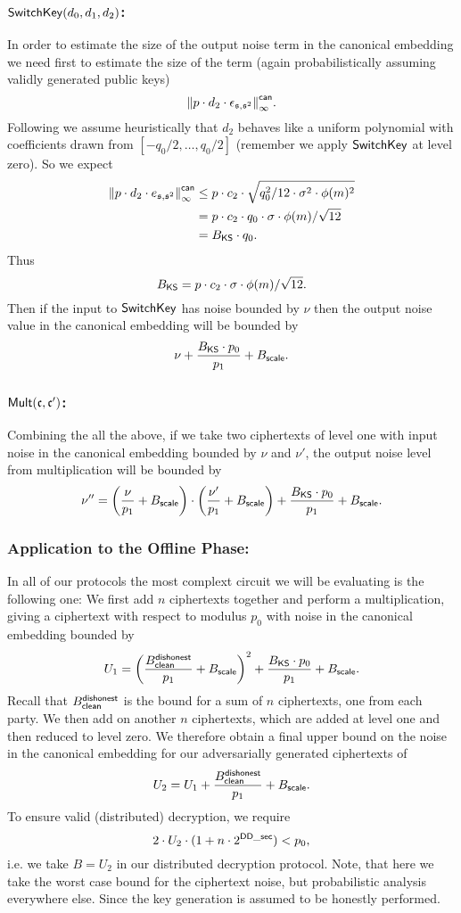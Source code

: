 \subsubsection{$\mathsf{SwitchKey}(d_0,d_1,d_2)$:}
In order to estimate the size of the output noise term 
in the canonical embedding we need first to estimate the size of the term
(again probabilistically assuming validly generated public
keys)
\[ {\Vert p \cdot d_2 \cdot \epsilon_{\mathfrak{s},\mathfrak{s}^2} \Vert}_\infty^{\mathsf{can}}. \]
Following \cite{GHS12c} we assume heuristically that $d_2$
behaves like a uniform polynomial with coefficients drawn from
$[-q_0/2,\ldots,q_0/2]$ (remember we apply $\mathsf{SwitchKey}$ at level
zero).
So we expect
\begin{align*}
 {\Vert  p \cdot d_2 \cdot e_{\mathfrak{s},\mathfrak{s}^2} \Vert}_\infty^{\mathsf{can}} 
     &\le p \cdot c_2 \cdot \sqrt{q_0^2/12 \cdot \sigma^2 \cdot \phi(m)^2} \\
     & = p \cdot c_2 \cdot q_0 \cdot \sigma \cdot \phi(m)/\sqrt{12} \\
     & = B_{\mathsf{KS}} \cdot q_0.
\end{align*}
Thus
\[ B_{\mathsf{KS}} = p \cdot c_2 \cdot \sigma \cdot \phi(m)/\sqrt{12}. \]
Then if the input to $\mathsf{SwitchKey}$ has noise bounded by $\nu$ then the output 
noise value in the canonical embedding will be bounded by
\[ \nu+\frac{B_{\mathsf{KS}} \cdot p_0}{p_1} + B_{\mathsf{scale}}. \]


\subsubsection{$\mathsf{Mult}(\mathfrak{c},\mathfrak{c}')$:}
Combining the all the above, if we take two ciphertexts of level one
with input noise in the canonical embedding bounded by $\nu$ and $\nu'$, the output noise level 
from multiplication will be bounded by
\[ \nu'' =      \left( \frac{\nu}{p_1} + B_{\mathsf{scale}} \right)
	  \cdot 
                \left( \frac{\nu'}{p_1} + B_{\mathsf{scale}} \right)
		+ \frac{B_{\mathsf{KS}} \cdot p_0}{p_1}+B_{\mathsf{scale}}.
\]

\subsubsection{Application to the Offline Phase:}
In all of our protocols the most complext circuit we will be evaluating 
is the following one: 
We first add $n$ ciphertexts together and perform a multiplication, giving a 
ciphertext with respect to modulus $p_0$ with noise in the canonical
embedding bounded by
\[
  U_1 = \left( \frac{B_{\mathsf{clean}}^{\mathsf{dishonest}}}{p_1}+B_{\mathsf{scale}} \right)^2
		+ \frac{B_{\mathsf{KS}} \cdot p_0}{p_1} + B_{\mathsf{scale}}.
\]
Recall that $B_{\mathsf{clean}}^{\mathsf{dishonest}}$ is the bound for a sum of 
$n$ ciphertexts, one from each party.
We then add on another $n$ ciphertexts, which are added at 
level one and then reduced to level zero.
We therefore obtain a final upper bound on the noise 
in the canonical embedding for our adversarially generated ciphertexts of
\[ U_2 = U_1 +  \frac{B_{\mathsf{clean}}^{\mathsf{dishonest}}}{p_1} + B_{\mathsf{scale}}. \]
To ensure valid (distributed) decryption, we require
\[ 2 \cdot U_2 \cdot (1+n \cdot 2^{\mathsf{DD\_sec}}) < p_0, \]
i.e. we take $B=U_2$ in our distributed decryption protocol.
Note, that here we take the worst case bound for the ciphertext
noise, but probabilistic analysis everywhere else. Since 
the key generation is assumed to be honestly performed.

